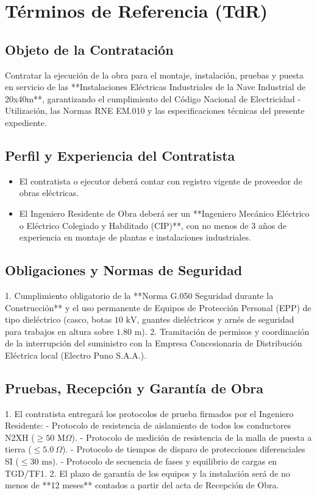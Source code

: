 \chapter{Términos de Referencia (TdR)}

\section{Objeto de la Contratación}
Contratar la ejecución de la obra para el montaje, instalación, pruebas y puesta en servicio de las **Instalaciones Eléctricas Industriales de la Nave Industrial de 20x40m**, garantizando el cumplimiento del Código Nacional de Electricidad - Utilización, las Normas RNE EM.010 y las especificaciones técnicas del presente expediente.

\section{Perfil y Experiencia del Contratista}
\begin{itemize}
    \item El contratista o ejecutor deberá contar con registro vigente de proveedor de obras eléctricas.
    \item El Ingeniero Residente de Obra deberá ser un **Ingeniero Mecánico Eléctrico o Eléctrico Colegiado y Habilitado (CIP)**, con no menos de 3 años de experiencia en montaje de plantas e instalaciones industriales.
\end{itemize}

\section{Obligaciones y Normas de Seguridad}
1. Cumplimiento obligatorio de la **Norma G.050 Seguridad durante la Construcción** y el uso permanente de Equipos de Protección Personal (EPP) de tipo dieléctrico (casco, botas $10\text{ kV}$, guantes dieléctricos y arnés de seguridad para trabajos en altura sobre $1.80\text{ m}$).
2. Tramitación de permisos y coordinación de la interrupción del suministro con la Empresa Concesionaria de Distribución Eléctrica local (Electro Puno S.A.A.).

\section{Pruebas, Recepción y Garantía de Obra}
1. El contratista entregará los protocolos de prueba firmados por el Ingeniero Residente:
   - Protocolo de resistencia de aislamiento de todos los conductores N2XH ($\ge 50 \text{ M}\Omega$).
   - Protocolo de medición de resistencia de la malla de puesta a tierra ($\le 5.0 \:\Omega$).
   - Protocolo de tiempos de disparo de protecciones diferenciales SI ($\le 30 \text{ ms}$).
   - Protocolo de secuencia de fases y equilibrio de cargas en TGD/TF1.
2. El plazo de garantía de los equipos y la instalación será de no menos de **12 meses** contados a partir del acta de Recepción de Obra.
